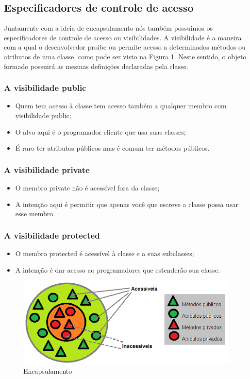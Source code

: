 \subsection{Especificadores de controle de acesso}

Juntamente com a ideia de encapsulamento nós também possuimos os especificadores de controle de acesso ou visibilidades. A visibilidade é a maneira com a qual o desenvolvedor proibe ou permite acesso a determinados métodos ou atributos de uma classe, como pode ser visto na Figura \ref{fig:encapsulamento}. Neste sentido, o objeto formado possuirá as mesmas definições declaradas pela classe.

\subsubsection{A visibilidade public}
\begin{itemize}
  \item Quem tem acesso à classe tem acesso também a qualquer membro com visibilidade public;
  \item O alvo aqui é o programador cliente que usa suas classes;
  \item É raro ter atributos públicos mas é comum ter métodos públicos.
\end{itemize}

\subsubsection{A visibilidade private}
\begin{itemize}
  \item O membro private não é acessível fora da classe;
  \item A intenção aqui é permitir que apenas você que escreve a classe possa usar esse membro.
\end{itemize}

\subsubsection{A visibilidade protected}
\begin{itemize}
  \item O membro protected é acessível à classe e a suas subclasses;
  \item A intenção é dar acesso ao programadores que estenderão sua classe.
\end{itemize}

\begin{figure}[H]
  \centering
  \includegraphics[scale=0.5]{imagens/encapsulamento.png}
  \caption{Encapsulamento}
  \label{fig:encapsulamento}
\end{figure}

